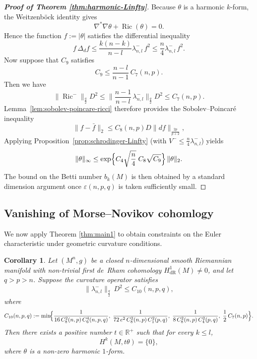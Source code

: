 \documentclass[12pt, twoside]{article}
\newtheorem{corollary}[theorem]{Corollary}
\theoremstyle{definition}
\numberwithin{equation}{section}
\begin{document}
\begin{proof}[\textbf{Proof of Theorem \ref{thm:harmonic-Linfty}}]
	Because \(\theta\) is a harmonic \(k\)-form, the Weitzenböck identity gives
	\[
	\nabla^{*}\nabla\theta + \operatorname{Ric}(\theta)=0.
	\]
	Hence the function \(f:=|\theta|\) satisfies the differential inequality
	\[
	f\,\Delta_{d}f \le \frac{k(n-k)}{n-l}\lambda^{-}_{n,l}\,f^{2}
	\le \frac{n}{4}\lambda^{-}_{n,l}\,f^{2}.
	\]
  Now suppose that \(C_{9}\) satisfies
	\[
	C_{9}\le \frac{n-l}{n-1}\,C_{7}(n,p).
	\]
	Then we have \[\|\operatorname{Ric}^{-}\|_{\frac{q}{2}}D^{2}\le  \|\frac{n-1}{n-l}\,\lambda_{n,l}^{-}\|_{\frac{q}{2} }D^{2}\le C_{7}(n,p).\]
	Lemma~\ref{lem:sobolev-poincare-ricci} therefore provides the Sobolev--Poincaré inequality
	\[
	\|f-\bar{f}\|_{2}\le C_{8}(n,p)D\|df\|_{\frac{2p}{p+2}},
	\]
	Applying Proposition~\ref{prop:schrodinger-Linfty} (with \(V^{-}\leq \frac{n}{4}\lambda^{-}_{n,l}\)) yields
	\[
	\|\theta\|_{\infty}
	\le \exp\Bigl\{ C_{4}\sqrt{\frac{n}{4}}\;C_{8}\sqrt{C_{9}} \Bigr\} \,\|\theta\|_{2}.
	\]
	The bound on the Betti number \(b_{k}(M)\) is then obtained by a standard dimension argument once \(\varepsilon(n,p,q)\) is taken sufficiently small.
\end{proof}	
	
\subsection{Vanishing of Morse--Novikov cohomlogy}
	We now apply Theorem \ref{thm:main1} to obtain constraints on the Euler characteristic under geometric curvature conditions.	

\begin{corollary}\label{cor:vanishing-kernel}
	Let \((M^{n},g)\) be a closed \(n\)-dimensional smooth Riemannian manifold with non-trivial first de~Rham cohomology \(H^{1}_{\mathrm{dR}}(M)\neq 0\), and let \(q > p > n\).
	Suppose the curvature operator satisfies
	\[
	\|\lambda_{n,l}^{-}\|_{\frac{q}{2}} \, D^{2} \le C_{10}(n,p,q),
	\]
	where
	\[
	C_{10}(n,p,q):=
	\min\!\Bigl\{
	\frac{1}{16\,C^{2}_{8}(n,p)\,C^{4}_{6}(n,p,q)},\;
	\frac{1}{72\,e^{2}\,C^{2}_8(n,p)\, C^{2}_{1}(p,q)},\;
	\frac{1}{8\,C_8^{2}(n,p)\, C^{2}_{4}(p,q)},\;
	\frac{1}{2}\,C_{7}(n,p)
	\Bigr\}.
	\]
	Then there exists a positive number \(t \in \mathbb{R}^{+}\) such that for every \(k \le l\),
	\[
	H^{k}(M,t\theta) = \{0\},
	\]
	where \(\theta\) is a non-zero harmonic \(1\)-form.
\end{corollary}
\end{document}
